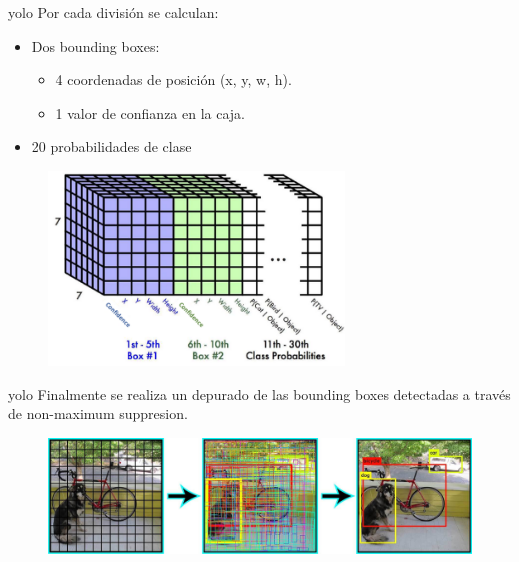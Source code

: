 \begin{frame}{\gls{yolo}}
Por cada división se calculan:
\begin{itemize}
    \item \alert{Dos bounding boxes}:
    \begin{itemize}
        \item 4 coordenadas de posición (x, y, w, h).
        \item 1 valor de confianza en la caja.
    \end{itemize}

    \item \alert{20 probabilidades de clase}
\end{itemize}

\begin{figure}
    \centering
    \includegraphics[width=0.7\textwidth]{Slides/figures/Tema 4/YOLO_End.png}
    \caption{\cite{YOLOFinal}}
\end{figure}
\end{frame}

\begin{frame}{\gls{yolo}}
Finalmente se realiza un \alert{depurado} de las \alert{bounding boxes} detectadas a través de \alert{non-maximum suppresion}.

\begin{figure}
    \centering
    \includegraphics[width=\textwidth]{Slides/figures/Tema 4/YOLO_FinalResults.jpg}
    \caption{\cite{YOLOResults}}
\end{figure}
\end{frame}

